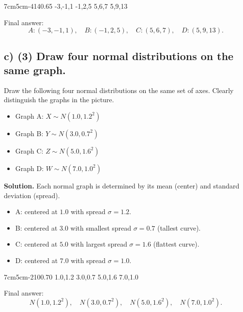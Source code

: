 	\TriangularFourGraph
	{7cm}{5cm}{-4}{14}{0.65}
	{-3,-1,1}
	{-1,2,5}
	{5,6,7}
	{5,9,13}
	
	Final answer:
	\[
	A:(-3,-1,1),\quad B:(-1,2,5),\quad C:(5,6,7),\quad D:(5,9,13).
	\]
	
	
	\subsection*{c) \textbf{(3)} Draw four normal distributions on the same graph.}
	\label{subsec:probability-distribution-graphs-c4-c}
	Draw the following four normal distributions on the same set of axes. Clearly distinguish the graphs in the picture.
	\begin{itemize}
		\item Graph A: $X\sim N(1.0,1.2^2)$
		\item Graph B: $Y\sim N(3.0,0.7^2)$
		\item Graph C: $Z\sim N(5.0,1.6^2)$
		\item Graph D: $W\sim N(7.0,1.0^2)$
	\end{itemize}
	\textbf{Solution.}
	Each normal graph is determined by its mean (center) and standard deviation (spread).
	\begin{itemize}
		\item A: centered at $1.0$ with spread $\sigma=1.2$.
		\item B: centered at $3.0$ with smallest spread $\sigma=0.7$ (tallest curve).
		\item C: centered at $5.0$ with largest spread $\sigma=1.6$ (flattest curve).
		\item D: centered at $7.0$ with spread $\sigma=1.0$.
	\end{itemize}
	
	\NormalFourGraph
	{7cm}{5cm}{-2}{10}{0.70}
	{1.0,1.2}
	{3.0,0.7}
	{5.0,1.6}
	{7.0,1.0}
	
	Final answer:
	\[
	N(1.0,1.2^2),\quad N(3.0,0.7^2),\quad N(5.0,1.6^2),\quad N(7.0,1.0^2).
	\]
	
	
